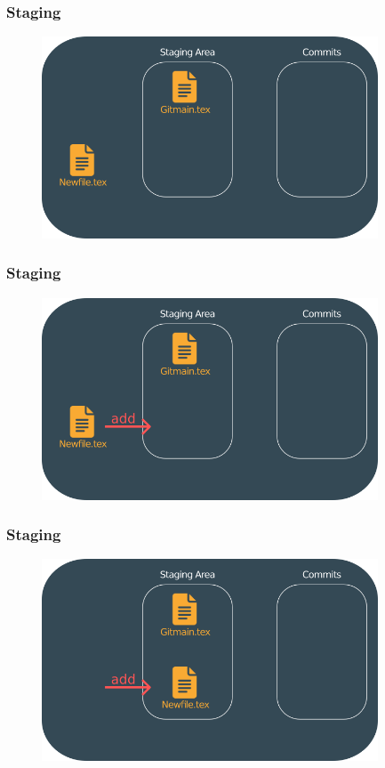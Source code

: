 \documentclass{beamer}
\begin{document}
	\begin{frame}
		\frametitle{Staging}
		\begin{figure}[htbp]
			\centering
			\includegraphics[width=10cm]{staging6}
		\end{figure}
	\end{frame}
	
	\begin{frame}
		\frametitle{Staging}
		\begin{figure}[htbp]
			\centering
			\includegraphics[width=10cm]{staging7}
		\end{figure}
	\end{frame}
	
	\begin{frame}
		\frametitle{Staging}
		\begin{figure}[htbp]
			\centering
			\includegraphics[width=10cm]{staging8}
		\end{figure}
	\end{frame}
	
\end{document}
